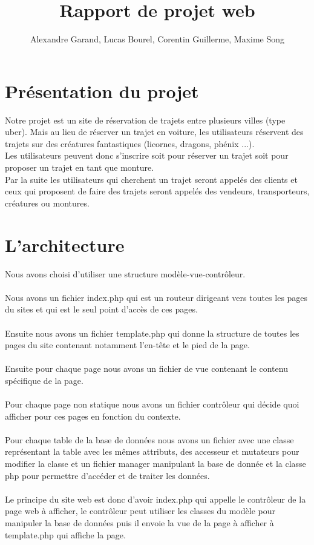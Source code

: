 \documentclass{article}
\title{Rapport de projet web}
\author{Alexandre Garand, Lucas Bourel, Corentin Guillerme, Maxime Song}
\begin{document}
\maketitle
\setcounter{tocdepth}{2}
\tableofcontents
\newpage

\section{Présentation du projet}
    Notre projet est un site de réservation de trajets entre plusieurs villes (type uber). Mais au lieu de réserver un trajet en voiture, les utilisateurs réservent des trajets sur des créatures fantastiques (licornes, dragons, phénix ...).
    \\
    
    Les utilisateurs peuvent donc s'inscrire soit pour réserver un trajet soit pour proposer un trajet en tant que monture.
    \\
    
    Par la suite les utilisateurs qui cherchent un trajet seront appelés des clients et ceux qui proposent de faire des trajets seront appelés des vendeurs, transporteurs, créatures ou montures.

\section{L'architecture}
	Nous avons choisi d'utiliser une structure modèle-vue-contrôleur.\\ \\
	Nous avons un fichier index.php qui est un routeur dirigeant vers toutes les pages du sites et qui est le seul point d’accès de ces pages.\\ \\
	Ensuite nous avons un fichier template.php qui donne la structure de toutes les pages du site contenant notamment l'en-tête et le pied de la page.\\ \\
	Ensuite pour chaque page nous avons un fichier de vue contenant le contenu spécifique de la page.\\ \\
	Pour chaque page non statique nous avons un fichier contrôleur qui décide quoi afficher pour ces pages en fonction du contexte.\\ \\
	Pour chaque table de la base de données nous avons un fichier avec une classe représentant la table avec les mêmes attributs, des accesseur et mutateurs pour modifier la classe et un fichier manager manipulant la base de donnée et la classe php pour permettre d'accéder et de traiter les données.\\ \\
	Le principe du site web est donc d'avoir index.php qui appelle le contrôleur de la page web à afficher, le contrôleur peut utiliser les classes du modèle pour manipuler la base de données puis il envoie la vue de la page à afficher à template.php qui affiche la page.
\end{document}
